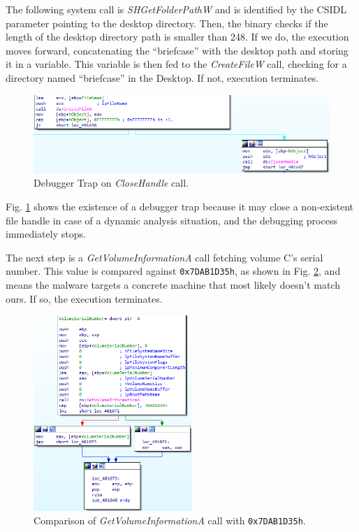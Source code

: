 The following system call is \textit{SHGetFolderPathW} and is identified by the CSIDL parameter pointing to the desktop directory. Then, the binary checks if the length of the desktop directory path is smaller than 248. If we do, the execution moves forward, concatenating the ``briefcase'' with the desktop path and storing it in a variable. This variable is then fed to the \textit{CreateFileW} call, checking for a directory named ``briefcase'' in the Desktop. If not, execution terminates. 

\begin{figure}[H]
    \includegraphics[width=12cm]{figures/ida_2.png}
    \caption{Debugger Trap on \textit{CloseHandle} call.}
    \label{fig:ida_2}
\end{figure}

Fig. \ref{fig:ida_2} shows the existence of a debugger trap because it may close a non-existent file handle in case of a dynamic analysis situation, and the debugging process immediately stops.

The next step is a \textit{GetVolumeInformationA} call fetching volume C's serial number. This value is compared against \texttt{0x7DAB1D35h}, as shown in Fig. \ref{fig:ida_3}, and means the malware targets a concrete machine that most likely doesn't match ours. If so, the execution terminates.

\begin{figure}[H]
    \includegraphics[width=6cm]{figures/ida_3.png}
    \caption{Comparison of \textit{GetVolumeInformationA} call with \texttt{0x7DAB1D35h}.}
    \label{fig:ida_3}
\end{figure}

